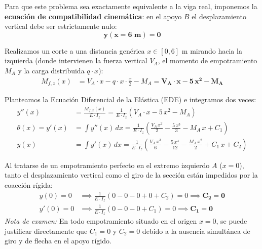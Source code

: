 {    Para que este problema sea exactamente equivalente a la viga real, imponemos la \textbf{ecuación de compatibilidad cinemática}: en el apoyo $B$ el desplazamiento vertical debe ser estrictamente nulo:
    \begin{equation}
        \mathbf{y(x = 6\text{ m}) = 0}
    \end{equation}


    Realizamos un corte a una distancia genérica $x \in [0, 6]\text{ m}$ mirando hacia la izquierda (donde intervienen la fuerza vertical $V_A$, el momento de empotramiento $M_A$ y la carga distribuida $q \cdot x$):
    \begin{align}
        M_{f,z}(x) & = V_A \cdot x - q \cdot x \cdot \frac{x}{2} - M_A = \mathbf{V_A \cdot x - 5\,x^2 - M_A}
    \end{align}

    Planteamos la Ecuación Diferencial de la Elástica (EDE) e integramos dos veces:
    \begin{align}
        y''(x)           & = \frac{M_{f,z}(x)}{E \cdot I_z} = \frac{1}{E \cdot I_z}\left(V_A \cdot x - 5\,x^2 - M_A\right)                                           \\
        \theta(x) = y'(x)& = \int y''(x)\,dx = \frac{1}{E \cdot I_z}\left(\frac{V_A\,x^2}{2} - \frac{5\,x^3}{3} - M_A\,x + C_1\right)                               \\
        y(x)             & = \int y'(x)\,dx = \frac{1}{E \cdot I_z}\left(\frac{V_A\,x^3}{6} - \frac{5\,x^4}{12} - \frac{M_A\,x^2}{2} + C_1\,x + C_2\right)
    \end{align}


    Al tratarse de un empotramiento perfecto en el extremo izquierdo $A$ ($x = 0$), tanto el desplazamiento vertical como el giro de la sección están impedidos por la coacción rígida:
    \begin{align}
        y(0) = 0   & \implies \frac{1}{E \cdot I_z}(0 - 0 - 0 + 0 + C_2) = 0 \implies \mathbf{C_2 = 0}  \\
        y'(0) = 0  & \implies \frac{1}{E \cdot I_z}(0 - 0 - 0 + C_1) = 0 \implies \mathbf{C_1 = 0}
    \end{align}
    \textit{Nota de examen:} En todo empotramiento situado en el origen $x = 0$, se puede justificar directamente que $C_1 = 0$ y $C_2 = 0$ debido a la ausencia simultánea de giro y de flecha en el apoyo rígido.

}
